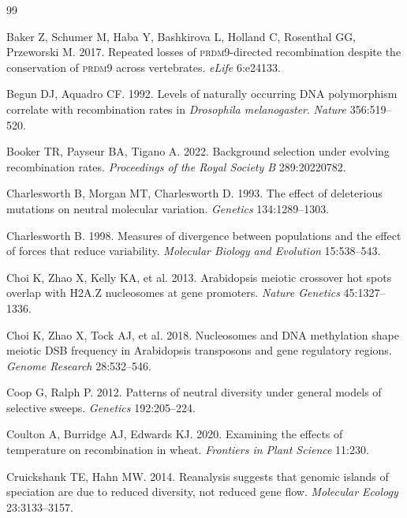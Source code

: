 \documentclass[11pt]{article}
\theoremstyle{remark}
\newcommand{\PRDM}{\textsc{prdm9}}
\begin{document}

\begin{thebibliography}{99}
\small

Baker Z, Schumer M, Haba Y, Bashkirova L, Holland C, Rosenthal GG, Przeworski M.
2017. Repeated losses of \PRDM-directed recombination despite the conservation of
\PRDM{} across vertebrates. \emph{eLife} 6:e24133.

Begun DJ, Aquadro CF. 1992. Levels of naturally occurring DNA polymorphism
correlate with recombination rates in \emph{Drosophila melanogaster}.
\emph{Nature} 356:519--520.

Booker TR, Payseur BA, Tigano A. 2022. Background selection under evolving
recombination rates. \emph{Proceedings of the Royal Society B} 289:20220782.

Charlesworth B, Morgan MT, Charlesworth D. 1993. The effect of deleterious
mutations on neutral molecular variation. \emph{Genetics} 134:1289--1303.

Charlesworth B. 1998. Measures of divergence between populations and the effect of
forces that reduce variability. \emph{Molecular Biology and Evolution} 15:538--543.

Choi K, Zhao X, Kelly KA, et al. 2013. Arabidopsis meiotic crossover hot spots
overlap with H2A.Z nucleosomes at gene promoters. \emph{Nature Genetics}
45:1327--1336.

Choi K, Zhao X, Tock AJ, et al. 2018. Nucleosomes and DNA methylation shape
meiotic DSB frequency in Arabidopsis transposons and gene regulatory regions.
\emph{Genome Research} 28:532--546.

Coop G, Ralph P. 2012. Patterns of neutral diversity under general models of
selective sweeps. \emph{Genetics} 192:205--224.

Coulton A, Burridge AJ, Edwards KJ. 2020. Examining the effects of temperature on
recombination in wheat. \emph{Frontiers in Plant Science} 11:230.

Cruickshank TE, Hahn MW. 2014. Reanalysis suggests that genomic islands of
speciation are due to reduced diversity, not reduced gene flow.
\emph{Molecular Ecology} 23:3133--3157.


\end{thebibliography}
\end{document}
